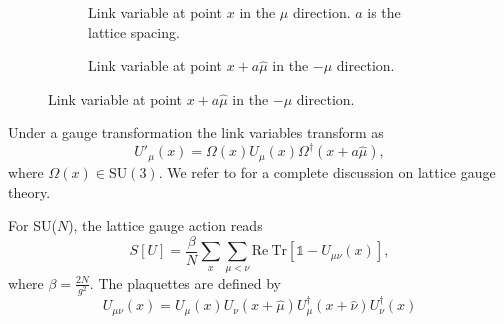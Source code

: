 \documentclass[12pt,a4paper]{article}
\begin{document}
\begin{figure}
\begin{center}
\begin{subfigure}{0.45\textwidth}
	\begin{center}
	\end{center}
	\caption{Link variable at point $x$ in the $\mu$ direction. $a$ is the lattice spacing.}
	\label{fig:link}
\end{subfigure}
\begin{subfigure}{0.45\textwidth}
	\begin{center}
	\end{center}
	\caption{Link variable at point $x+a\hat\mu$ in the $-\mu$ direction.}
	\label{fig:conjg_link}
\end{subfigure}
\end{center}
\end{figure}

Under a gauge transformation the link variables transform as
\begin{equation}
	U'_{\mu}(x) = \Omega(x) U_{\mu}(x) \Omega^{\dagger}(x+a\hat\mu),
\end{equation}
where $\Omega(x)\in\text{SU}(3)$. We refer to \cite{gattringer} for a complete discussion on lattice gauge theory.



For SU($N$), the lattice gauge action reads
\begin{equation}
	\label{eq:wilson_action}
	S[U] = \frac{\beta}{N}\sum_x \sum_{\mu < \nu} \text{Re}\ \text{Tr} \left[\mathds{1} - U_{\mu\nu}(x) \right],
\end{equation}
where $\beta = \frac{2N}{g^2}$. The plaquettes are defined by
\begin{equation}
	\label{eq:plaquette}
	U_{\mu\nu}(x) = U_{\mu}(x)U_{\nu}(x+\hat{\mu})U_{\mu}^{\dagger}(x+\hat{\nu})U_{\nu}^{\dagger}(x) 
\end{equation}
\end{document}
